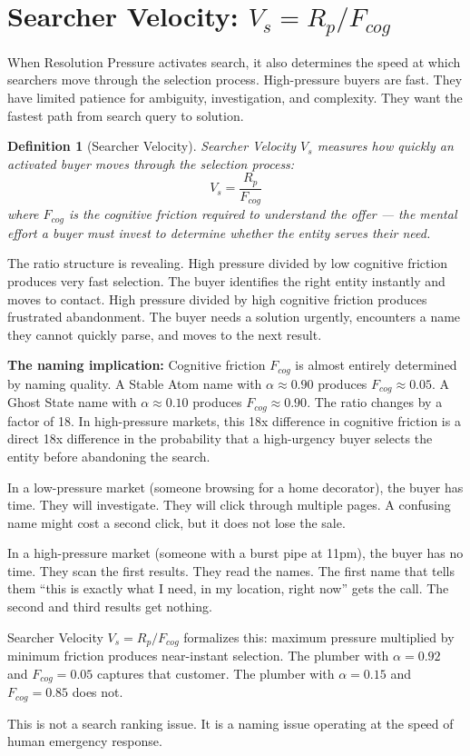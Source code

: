\documentclass[12pt, openany]{book}
\theoremstyle{thmstyle}
\theoremstyle{defstyle}
\newtheorem{definition}{Definition}[chapter]
\begin{document}
\section{Searcher Velocity: $V_s = R_p / F_{cog}$}

When Resolution Pressure activates search, it also determines the speed at which searchers move through the selection process. High-pressure buyers are fast. They have limited patience for ambiguity, investigation, and complexity. They want the fastest path from search query to solution.

\begin{definition}[Searcher Velocity]
Searcher Velocity $V_s$ measures how quickly an activated buyer moves through the selection process:
\begin{equation}
V_s = \frac{R_p}{F_{cog}}
\label{eq:searcher_velocity}
\end{equation}
where $F_{cog}$ is the cognitive friction required to understand the offer --- the mental effort a buyer must invest to determine whether the entity serves their need.
\end{definition}

The ratio structure is revealing. High pressure divided by low cognitive friction produces very fast selection. The buyer identifies the right entity instantly and moves to contact. High pressure divided by high cognitive friction produces frustrated abandonment. The buyer needs a solution urgently, encounters a name they cannot quickly parse, and moves to the next result.

\textbf{The naming implication:} Cognitive friction $F_{cog}$ is almost entirely determined by naming quality. A Stable Atom name with $\alpha \approx 0.90$ produces $F_{cog} \approx 0.05$. A Ghost State name with $\alpha \approx 0.10$ produces $F_{cog} \approx 0.90$. The ratio changes by a factor of 18. In high-pressure markets, this 18x difference in cognitive friction is a direct 18x difference in the probability that a high-urgency buyer selects the entity before abandoning the search.

\begin{pressurebox}
In a low-pressure market (someone browsing for a home decorator), the buyer has time. They will investigate. They will click through multiple pages. A confusing name might cost a second click, but it does not lose the sale.

In a high-pressure market (someone with a burst pipe at 11pm), the buyer has no time. They scan the first results. They read the names. The first name that tells them ``this is exactly what I need, in my location, right now'' gets the call. The second and third results get nothing.

Searcher Velocity $V_s = R_p / F_{cog}$ formalizes this: maximum pressure multiplied by minimum friction produces near-instant selection. The plumber with $\alpha = 0.92$ and $F_{cog} = 0.05$ captures that customer. The plumber with $\alpha = 0.15$ and $F_{cog} = 0.85$ does not.

This is not a search ranking issue. It is a naming issue operating at the speed of human emergency response.
\end{pressurebox}
\end{document}
